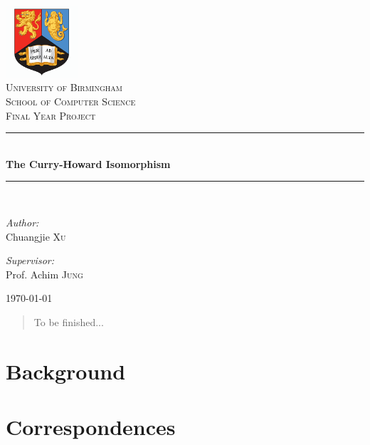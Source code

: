 \documentclass[12pt,a4paper,fleqn]{article}
\theoremstyle{definition}
\theoremstyle{plain}
\theoremstyle{plain}
\theoremstyle{definition}
\begin{document}
\begin{titlepage}
\begin{center}
\includegraphics[width=0.2\textwidth]{./images/bham_logo}\\[1cm]
\textsc{\LARGE University of Birmingham}\\[0.5cm]
\textsc{\Large School of Computer Science}\\[1.5cm]
\textsc{\large Final Year Project}\\[0.3cm]
\rule{\linewidth}{0.5mm} \\[0.6cm]
{ \huge \bfseries The Curry-Howard Isomorphism}\\[0.1cm]
\rule{\linewidth}{0.5mm} \\[1.5cm]
\begin{minipage}{0.4\textwidth}
\begin{flushleft} \large
\emph{Author:}\\
Chuangjie \textsc{Xu}
\end{flushleft}
\end{minipage}
\begin{minipage}{0.4\textwidth}
\begin{flushright} \large
\emph{Supervisor:} \\
Prof. Achim \textsc{Jung}
\end{flushright}
\end{minipage}
\vfill
{\large \today}
\end{center}
\end{titlepage}

\begin{abstract}
To be finished...
\end{abstract}

\newpage
\tableofcontents



\newpage
\section{Background}




\newpage
\section{Correspondences}




\newpage


\nocite{*}
\end{document}
